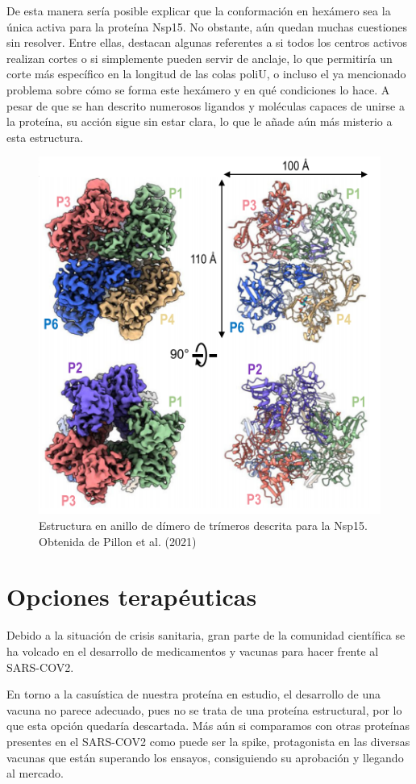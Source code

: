 \documentclass[12pt]{article}
\begin{document}
De esta manera sería posible explicar que la conformación en hexámero sea la única activa para la proteína Nsp15. No obstante, aún quedan muchas cuestiones sin resolver. Entre ellas, destacan algunas referentes a si todos los centros activos realizan cortes o si simplemente pueden servir de anclaje, lo que permitiría un corte más específico en la longitud de las colas poliU, o incluso el ya mencionado problema sobre cómo se forma este hexámero y en qué condiciones lo hace. A pesar de que se han descrito numerosos ligandos y moléculas capaces de unirse a la proteína, su acción sigue sin estar clara, lo que le añade aún más misterio a esta estructura.
\begin{figure}[H]
\centering
\includegraphics[scale=0.8]{Screenshot_20}
\caption{Estructura en anillo de dímero de trímeros descrita para la Nsp15. Obtenida de Pillon et al. (2021)}
\end{figure}


\section{Opciones terapéuticas}

Debido a la situación de crisis sanitaria, gran parte de la comunidad científica se ha volcado en el desarrollo de medicamentos y vacunas para hacer frente al SARS-COV2. 
\newline

En torno a la casuística de nuestra proteína en estudio, el desarrollo de una vacuna no parece adecuado, pues no se trata de una proteína estructural, por lo que esta opción quedaría descartada. Más aún si comparamos con otras proteínas presentes en el SARS-COV2 como puede ser la spike, protagonista en las diversas vacunas que están superando los ensayos, consiguiendo su aprobación y llegando al mercado.
\newline
\end{document}
